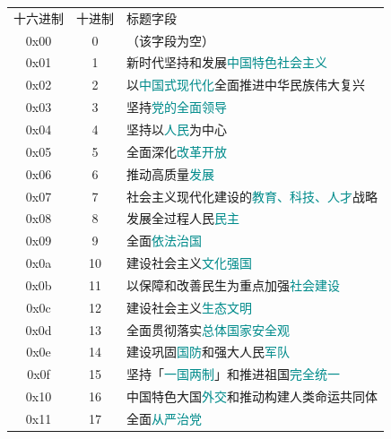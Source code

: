 \documentclass[UTF8]{ctexart}
\newcommand\keyword[1]{\textcolor{darkcyan}{#1}}
\begin{document}
\begin{table}[htb]
    \small
    \centering
    \begin{tabular}{ccl}
        \rowcolor{violet!40} 十六进制 & 十进制 & 标题字段 \\
        0x00 & 0 & \textcolor{violet!50}{（该字段为空）}\\
        0x01 & 1 & 新时代坚持和发展\keyword{中国特色社会主义} \\
        0x02 & 2 & 以\keyword{中国式现代化}全面推进中华民族伟大复兴\\
        0x03 & 3 & 坚持\keyword{党的全面领导}\\
        0x04 & 4 & 坚持以\keyword{人民}为中心\\
        0x05 & 5 & 全面深化\keyword{改革开放}\\
        0x06 & 6 & 推动高质量\keyword{发展}\\
        0x07 & 7 & 社会主义现代化建设的\keyword{教育、科技、人才}战略\\
        0x08 & 8 & 发展全过程人民\keyword{民主}\\
        0x09 & 9 & 全面\keyword{依法治国}\\
        0x0a & 10 & 建设社会主义\keyword{文化强国}\\
        0x0b & 11 & 以保障和改善民生为重点加强\keyword{社会建设}\\
        0x0c & 12 & 建设社会主义\keyword{生态文明}\\
        0x0d & 13 & 全面贯彻落实\keyword{总体国家安全观}\\
        0x0e & 14 & 建设巩固\keyword{国防}和强大人民\keyword{军队}\\
        0x0f & 15 & 坚持「\keyword{一国两制}」和推进祖国\keyword{完全统一}\\
        0x10 & 16 & 中国特色大国\keyword{外交}和推动构建人类命运共同体\\
        0x11 & 17 & 全面\keyword{从严治党}\\
    \end{tabular}
\end{table}
\end{document}

